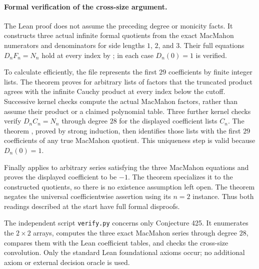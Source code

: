 \documentclass[10pt]{article}
\begin{document}
\paragraph{Formal verification of the cross-size argument.}
The Lean proof does not assume the preceding degree or monicity facts.
It constructs three actual infinite formal quotients from the exact
MacMahon numerators and denominators for side lengths $1$, $2$, and $3$.
Their full equations $D_nF_n=N_n$ hold at every index by
; in each case $D_n(0)=1$ is verified.

To calculate efficiently, the file represents the first $29$ coefficients
by finite integer lists. The theorem  proves
for arbitrary lists of factors that the truncated product agrees with the
infinite Cauchy product at every index below the cutoff. Successive kernel
checks compute the actual MacMahon factors, rather than assume their
product or a claimed polynomial table. Three further kernel checks verify
$D_n C_n=N_n$ through degree $28$ for the displayed coefficient lists $C_n$.
The theorem , proved by strong induction,
then identifies those lists with the first $29$ coefficients of any true
MacMahon quotient. This uniqueness step is valid because $D_n(0)=1$.

Finally  applies to arbitrary series
satisfying the three MacMahon equations and proves the displayed
coefficient to be $-1$. The theorem
 specializes it to the constructed
quotients, so there is no existence assumption left open. The theorem
 negates the
universal coefficientwise assertion using its $n=2$ instance.
Thus both readings described at the start have full formal disproofs.

The independent script \texttt{verify.py} concerns only Conjecture 425.
It enumerates the $2\times2$ arrays, computes the three exact MacMahon
series through degree $28$, compares them with the Lean coefficient
tables, and checks the cross-size convolution. Only the standard Lean
foundational axioms occur; no additional axiom or external decision
oracle is used.
\end{document}
